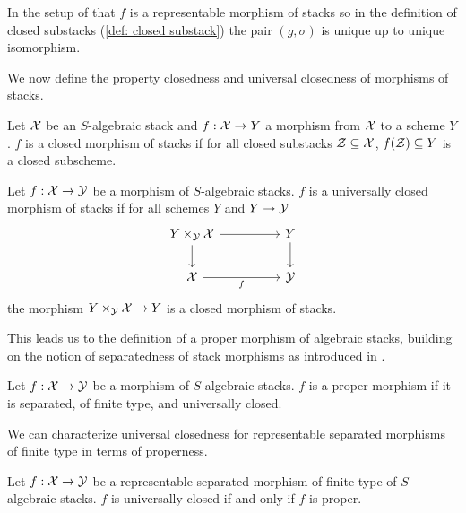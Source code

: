 \begin{remark}
    In the setup of  that $f$ is a representable morphism of stacks so in the definition of closed substacks (\ref{def: closed substack}) the pair $(g,\sigma)$ is unique up to unique isomorphism. 
\end{remark}
We now define the property closedness and universal closedness of morphisms of stacks. 
\begin{definition}\label{def: closed morphism of stacks}
    Let $\mathcal{X}$ be an $S$-algebraic stack and $f:\mathcal{X}\to Y$ a morphism from $\mathcal{X}$ to a scheme $Y$. $f$ is a closed morphism of stacks if for all closed substacks $\mathcal{Z}\subseteq\mathcal{X}$, $f(\mathcal{Z})\subseteq Y$ is a closed subscheme. 
\end{definition}
\begin{definition}\label{def: universally closed morphism of stacks}
    Let $f:\mathcal{X}\to\mathcal{Y}$ be a morphism of $S$-algebraic stacks. $f$ is a universally closed morphism of stacks if for all schemes $Y$ and $Y\to\mathcal{Y}$ 
    $$%
    \begin{tikzcd}
        {Y\times_{\Ycal}\Xcal} && Y \\
        \Xcal && \Ycal
        \arrow["f"', from=2-1, to=2-3]
        \arrow[from=1-3, to=2-3]
        \arrow[from=1-1, to=2-1]
        \arrow[from=1-1, to=1-3]
    \end{tikzcd}$$
    the morphism $Y\times_{\mathcal{Y}}\mathcal{X}\to Y$ is a closed morphism of stacks. 
\end{definition}
This leads us to the definition of a proper morphism of algebraic stacks, building on the notion of separatedness of stack morphisms as introduced in .
\begin{definition}\label{def: proper morphism of stacks}
    Let $f:\mathcal{X}\to\mathcal{Y}$ be a morphism of $S$-algebraic stacks. $f$ is a proper morphism if it is separated, of finite type, and universally closed. 
\end{definition}
We can characterize universal closedness for representable separated morphisms of finite type in terms of properness.
\begin{proposition}\label{prop: separated finite type is universally closed iff proper}
    Let $f:\mathcal{X}\to\mathcal{Y}$ be a representable separated morphism of finite type of $S$-algebraic stacks. $f$ is universally closed if and only if $f$ is proper. 
\end{proposition}
